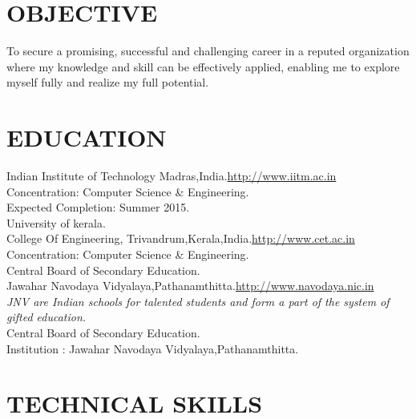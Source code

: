 \documentclass[11pt,a4paper,sans]{moderncv}
\begin{document}
\maketitle

\section{OBJECTIVE}
To secure a promising, successful and challenging career in a reputed organization where my knowledge and skill can be effectively applied, enabling me to explore myself fully and realize my full potential.\\


\section{EDUCATION}
{
Indian Institute of Technology Madras,India.\hfill \url{http://www.iitm.ac.in}\\
Concentration: Computer Science \& Engineering.\\
Expected Completion: Summer 2015.\\
}
{
University of kerala.\\
College Of Engineering, Trivandrum,Kerala,India.\hfill\url{http://www.cet.ac.in}\\
Concentration: Computer Science \& Engineering.\\
}
{
Central Board of Secondary Education.\\
Jawahar Navodaya Vidyalaya,Pathanamthitta.\hfill \url{http://www.navodaya.nic.in}\\
\textit{JNV are Indian schools for talented students and form a part of the system of gifted education.}\\
}
{
Central Board of Secondary Education.\\
Institution : Jawahar Navodaya Vidyalaya,Pathanamthitta. \\
}

\section{TECHNICAL SKILLS}
\end{document}
